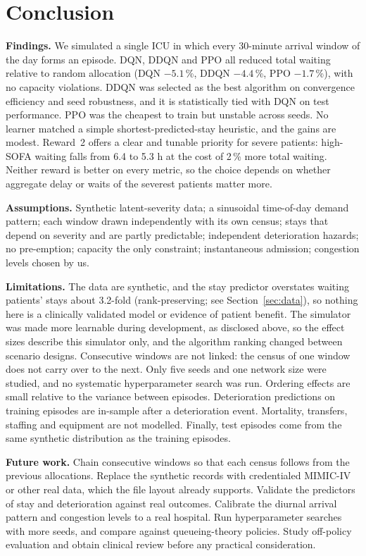 \documentclass{rlreport}
\begin{document}
\section{Conclusion}
\textbf{Findings.} We simulated a single ICU in which every 30-minute arrival window of the day forms an episode. DQN, DDQN and PPO all reduced total waiting relative to random allocation (DQN $-5.1$\,\%, DDQN $-4.4$\,\%, PPO $-1.7$\,\%), with no capacity violations. DDQN was selected as the best algorithm on convergence efficiency and seed robustness, and it is statistically tied with DQN on test performance. PPO was the cheapest to train but unstable across seeds. No learner matched a simple shortest-predicted-stay heuristic, and the gains are modest. Reward~2 offers a clear and tunable priority for severe patients: high-SOFA waiting falls from 6.4 to 5.3 h at the cost of 2\,\% more total waiting. Neither reward is better on every metric, so the choice depends on whether aggregate delay or waits of the severest patients matter more.

\textbf{Assumptions.} Synthetic latent-severity data; a sinusoidal time-of-day demand pattern; each window drawn independently with its own census; stays that depend on severity and are partly predictable; independent deterioration hazards; no pre-emption; capacity the only constraint; instantaneous admission; congestion levels chosen by us.

\textbf{Limitations.} The data are synthetic, and the stay predictor overstates waiting patients' stays about 3.2-fold (rank-preserving; see Section~\ref{sec:data}), so nothing here is a clinically validated model or evidence of patient benefit. The simulator was made more learnable during development, as disclosed above, so the effect sizes describe this simulator only, and the algorithm ranking changed between scenario designs. Consecutive windows are not linked: the census of one window does not carry over to the next. Only five seeds and one network size were studied, and no systematic hyperparameter search was run. Ordering effects are small relative to the variance between episodes. Deterioration predictions on training episodes are in-sample after a deterioration event. Mortality, transfers, staffing and equipment are not modelled. Finally, test episodes come from the same synthetic distribution as the training episodes.

\textbf{Future work.} Chain consecutive windows so that each census follows from the previous allocations. Replace the synthetic records with credentialed MIMIC-IV or other real data, which the file layout already supports. Validate the predictors of stay and deterioration against real outcomes. Calibrate the diurnal arrival pattern and congestion levels to a real hospital. Run hyperparameter searches with more seeds, and compare against queueing-theory policies. Study off-policy evaluation and obtain clinical review before any practical consideration.
\end{document}
